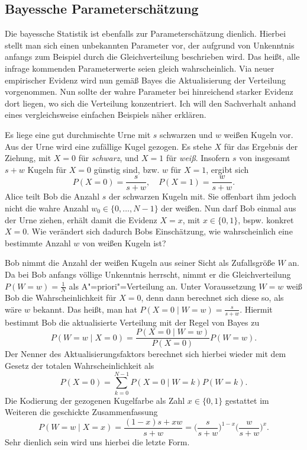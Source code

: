 \subsection{Bayessche Parameterschätzung}

Die bayessche Statistik ist ebenfalls zur Parameterschätzung dienlich.
Hierbei stellt man sich einen unbekannten Parameter vor, der aufgrund
von Unkenntnis anfangs zum Beispiel durch die Gleichverteilung
beschrieben wird. Das heißt, alle infrage kommenden Parameterwerte
seien gleich wahrscheinlich. Via neuer empirischer Evidenz wird nun
gemäß Bayes die Aktualisierung der Verteilung vorgenommen. Nun sollte
der wahre Parameter bei hinreichend starker Evidenz dort liegen, wo
sich die Verteilung konzentriert. Ich will den Sachverhalt anhand eines
vergleichsweise einfachen Beispiels näher erklären.

Es liege eine gut durchmischte Urne mit $s$ schwarzen und $w$ weißen
Kugeln vor. Aus der Urne wird eine zufällige Kugel gezogen. Es stehe
$X$ für das Ergebnis der Ziehung, mit $X=0$ für \emph{schwarz}, und
$X=1$ für \emph{weiß}. Insofern $s$ von insgesamt $s+w$ Kugeln für
$X=0$ günstig sind, bzw. $w$ für $X=1$, ergibt sich
\[P(X=0)=\frac{s}{s+w},\quad P(X=1)=\frac{w}{s+w}.\]
Alice teilt Bob die Anzahl $s$ der schwarzen Kugeln mit. Sie offenbart
ihm jedoch nicht die wahre Anzahl $w_0\in\{0,\ldots,N-1\}$ der
weißen. Nun darf Bob einmal aus der Urne ziehen, erhält damit die
Evidenz $X=x$, mit $x\in\{0,1\}$, bspw. konkret $X=0$. Wie verändert
sich dadurch Bobs Einschätzung, wie wahrscheinlich eine bestimmte Anzahl
$w$ von weißen Kugeln ist?

Bob nimmt die Anzahl der weißen Kugeln aus seiner Sicht als Zufallsgröße
$W$ an. Da bei Bob anfangs völlige Unkenntnis herrscht, nimmt
er die Gleichverteilung $P(W=w)=\frac{1}{N}$ als A"=priori"=Verteilung
an. Unter Voraussetzung $W=w$ weiß Bob die Wahrscheinlichkeit für
$X=0$, denn dann berechnet sich diese so, als wäre $w$ bekannt.
Das heißt, man hat $P(X=0\mid W=w)=\frac{s}{s+w}$. Hiermit bestimmt
Bob die aktualisierte Verteilung mit der Regel von Bayes zu
\[P(W=w\mid X=0) = \frac{P(X=0\mid W=w)}{P(X=0)}P(W=w).\]
Der Nenner des Aktualisierungsfaktors berechnet sich hierbei wieder mit
dem Gesetz der totalen Wahrscheinlichkeit als
\[P(X=0) = \sum_{k=0}^{N-1}P(X=0\mid W=k)P(W=k).\]
Die Kodierung der gezogenen Kugelfarbe als Zahl $x\in\{0,1\}$ gestattet
im Weiteren die geschickte Zusammenfassung
\[P(W=w\mid X=x) = \frac{(1-x)s+xw}{s+w}
= \Big(\frac{s}{s+w}\Big)^{1-x}\Big(\frac{w}{s+w}\Big)^x.\]
Sehr dienlich sein wird uns hierbei die letzte Form.

